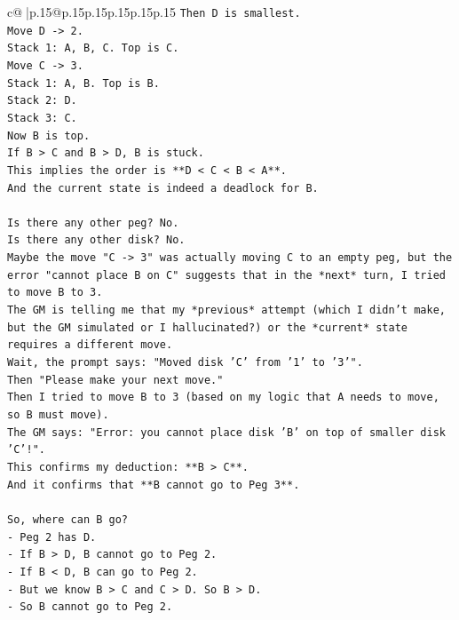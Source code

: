 \documentclass{article}
\begin{document}
{\begin{supertabular}{c@{$\;$}|p{.15\linewidth}@{}p{.15\linewidth}p{.15\linewidth}p{.15\linewidth}p{.15\linewidth}p{.15\linewidth}}
{{{\texttt{Then D is smallest.} \\
\texttt{Move D {-}> 2.} \\
\texttt{Stack 1: A, B, C. Top is C.} \\
\texttt{Move C {-}> 3.} \\
\texttt{Stack 1: A, B. Top is B.} \\
\texttt{Stack 2: D.} \\
\texttt{Stack 3: C.} \\
\texttt{Now B is top.} \\
\texttt{If B > C and B > D, B is stuck.} \\
\texttt{This implies the order is **D < C < B < A**.} \\
\texttt{And the current state is indeed a deadlock for B.} \\
\\ 
\texttt{Is there any other peg? No.} \\
\texttt{Is there any other disk? No.} \\
\texttt{Maybe the move "C {-}> 3" was actually moving C to an empty peg, but the error "cannot place B on C" suggests that in the *next* turn, I tried to move B to 3.} \\
\texttt{The GM is telling me that my *previous* attempt (which I didn't make, but the GM simulated or I hallucinated?) or the *current* state requires a different move.} \\
\texttt{Wait, the prompt says: "Moved disk 'C' from '1' to '3'".} \\
\texttt{Then "Please make your next move."} \\
\texttt{Then I tried to move B to 3 (based on my logic that A needs to move, so B must move).} \\
\texttt{The GM says: "Error: you cannot place disk 'B' on top of smaller disk 'C'!".} \\
\texttt{This confirms my deduction: **B > C**.} \\
\texttt{And it confirms that **B cannot go to Peg 3**.} \\
\\ 
\texttt{So, where can B go?} \\
\texttt{{-} Peg 2 has D.} \\
\texttt{{-} If B > D, B cannot go to Peg 2.} \\
\texttt{{-} If B < D, B can go to Peg 2.} \\
\texttt{{-} But we know B > C and C > D. So B > D.} \\
\texttt{{-} So B cannot go to Peg 2.} \\
}}}
\end{supertabular}}
\end{document}
